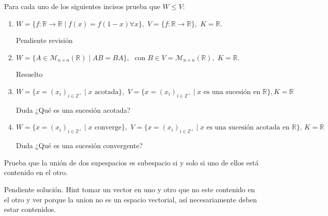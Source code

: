 \begin{exercise}{}{} 
    Para cada uno de los siguientes incisos prueba que $W \leq V$:
    \begin{enumerate}

        \item $W = \{f: \mathbb{R} \rightarrow \mathbb{R} \mid f(x) = f(1-x) \forall x\}, \, \, V = \{f: \mathbb{R} \rightarrow \mathbb{R}\}, \, \, K = \mathbb{R}$.
\begin{solution}{}{}
Pendiente revisión
\end{solution}


        \item $W = \{A \in \mathcal{M}_{n \times n} (\mathbb{R}) \mid AB = BA\}, \, \, \text{ con } B\in V = \mathcal{M}_{n \times n} (\mathbb{R}), \, \, K = \mathbb{R}$.
\begin{solution}{}{}
Resuelto
\end{solution}

        \item $W = \{x = (x_i)_{i \in \mathbb{Z}^+} \mid x \text{ acotada}\}, \, \, V = \{x = (x_i)_{i \in \mathbb{Z}^+} \mid x \text{ es una sucesión en $\mathbb{R}$}\} , K = \mathbb{R}$
\begin{solution}{}{}
Duda ¿Qué es una sucesión acotada?
\end{solution}

        \item $W = \{x = (x_i)_{i \in \mathbb{Z}^+} \mid x \text{ converge}\}, \, \, V = \{x = (x_i)_{i \in \mathbb{Z}^+} \mid x \text{ es una sucesión acotada en $\mathbb{R}$}\}, \, K = \mathbb{R}$
\begin{solution}{}{}
Duda ¿Qué es una sucesión convergente?
\end{solution}

    \end{enumerate}

\end{exercise}

\begin{exercise}{}{}
Prueba que la unión de dos supespacios es subespacio si y solo si uno de ellos está contenido en el otro.

\begin{solution}{}{}
Pendiente solución. Hint tomar un vector en uno y otro que no este contenido en el otro y ver porque la union no es un espacio vectorial, así necesariamente deben estar contenidos.
\end{solution}

\end{exercise}



